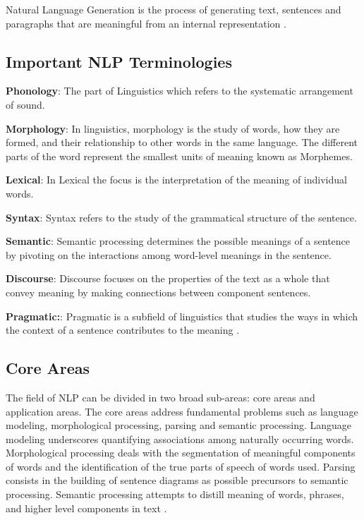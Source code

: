 Natural Language Generation is the process of generating text, sentences and
paragraphs that are meaningful from an internal representation \cite{Khurana2018}. 

\subsection{Important NLP Terminologies}

\textbf{Phonology}: The part of Linguistics which refers to the systematic arrangement of sound.

\textbf{Morphology}: In linguistics, morphology is the study of words, how they are formed, and their relationship to other words in the same language. The different parts of the word represent the smallest units of meaning known as Morphemes.


\textbf{Lexical}: In Lexical the focus is the interpretation of the meaning of individual words.

\textbf{Syntax}: Syntax refers to the study of the grammatical structure of the sentence. 

\textbf{Semantic}: Semantic processing determines the possible meanings of a
sentence by pivoting on the interactions among word-level meanings in the sentence.

\textbf{Discourse}: Discourse focuses on the properties of the text as a whole that convey meaning by making connections between component sentences.

\textbf{Pragmatic:}: Pragmatic is a subfield of linguistics that studies the ways in which the context of a sentence contributes to the meaning \cite{Khurana2018}. 










\subsection{Core Areas}

The field of NLP can be divided in two broad sub-areas: core areas and application areas. The core areas address fundamental problems such as language modeling, morphological processing, parsing and semantic processing. Language modeling underscores quantifying associations among naturally occurring words. Morphological processing deals with the segmentation of meaningful components of words and the identification of the true parts of speech of words used. Parsing consists in the building of sentence diagrams as possible precursors to semantic processing. Semantic processing attempts to distill meaning of words, phrases, and higher level components in text \cite{Otter2018}.

